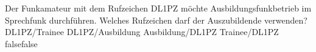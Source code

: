     {Der Funkamateur mit dem Rufzeichen DL1PZ möchte Ausbildungsfunkbetrieb im Sprechfunk durchführen. Welches Rufzeichen darf der Auszubildende verwenden?}
    {DL1PZ/Trainee}
    {DL1PZ/Ausbildung}
    {Ausbildung/DL1PZ}
    {Trainee/DL1PZ}
    {false}{false}